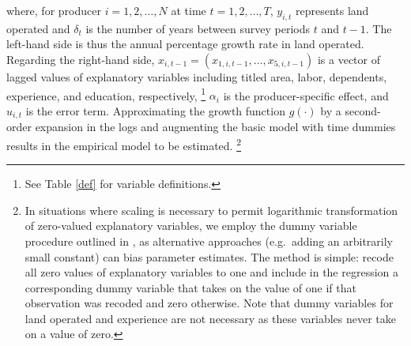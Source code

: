 \documentclass[english]{article}
\begin{document}
\noindent
where, for producer $i=1,2,\ldots,N$ at time $t=1,2,\ldots,T$, $y_{i,t}$
represents land operated and $\delta_t$ is the number of years between 
survey periods $t$ and $t-1$. The left-hand side is thus the annual 
percentage growth rate in land operated. Regarding the right-hand side,
$x_{i,t-1} = (x_{1,i,t-1}, \ldots, x_{5,i,t-1} )$ is a vector of lagged values 
of explanatory variables including titled area, labor, dependents, experience, 
and education, respectively,%
\footnote{See Table \ref{def} for variable definitions.} 
$\alpha_i$ is the producer-specific effect, and $u_{i,t}$ is the error term. 
Approximating the growth function $g(\cdot)$ by a second-order expansion 
in the logs and augmenting the basic model with time dummies results in the 
empirical model to be estimated.%
\footnote{In situations where scaling is necessary to permit logarithmic 
transformation of zero-valued explanatory variables, we employ the dummy
variable procedure outlined in \citet{battese1997}, as alternative approaches 
(e.g.\ adding an arbitrarily small constant) can bias parameter estimates.
The method is simple: recode all zero values of explanatory variables to one 
and include in the regression a corresponding dummy variable that takes on 
the value of one if that observation was recoded and zero otherwise. 
Note that dummy variables for land operated and experience are not 
necessary as these variables never take on a value of zero.}

\end{document}
